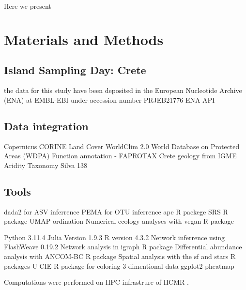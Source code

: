 \documentclass[unnumsec,webpdf,contemporary,large]{oup-authoring-template}%
\theoremstyle{thmstyleone}%
\theoremstyle{thmstyletwo}%
\theoremstyle{thmstylethree}%
\begin{document}
Here we present



\section{Materials and Methods}\label{methods}


\subsection{Island Sampling Day: Crete}\label{isd_data}

the data for this study have been deposited in the European Nucleotide Archive (ENA) at EMBL-EBI under accession number PRJEB21776
ENA API \citep{Yuan2023}

\subsection{Data integration}\label{data}

Copernicus CORINE Land Cover \citep{CLC2023}
WorldClim 2.0 \citep{Fick2017}
World Database on Protected Areas (WDPA) \citep{Hanson2022}
Function annotation - FAPROTAX \citep{Louca2016}
Crete geology from IGME
Aridity
Taxonomy Silva 138 \citep{Quast2012}

\subsection{Tools}\label{tools}
dada2 for ASV inferrence \citep{Callahan2016}
PEMA for OTU inferrence \citep{Zafeiropoulos2020}
ape R packege \citep{Paradis2004}
SRS R package \citep{Beule2020}
UMAP ordination \citep{mcinnes2018umap-software}
Numerical ecology analyses with vegan R package \citep{vegan}

Python 3.11.4
Julia Version 1.9.3 \citep{Julia-2017}
R version 4.3.2 \citep{rcoreteam}
Network inferrence using FlashWeave 0.19.2 \citep{Tackmann2019}
Network analysis in igraph R package \citep{Csardi2006}
Differential abundance analysis with ANCOM-BC R package \citep{Lin2020}
Spatial analysis with the sf and stars R packages \citep{Pebesma2023}
U-CIE R package for coloring 3 dimentional data \citep{Koutrouli2022}
ggplot2 \citep{ggplot22016}
pheatmap \citep{Kolde2019}

Computations were performed on HPC infrastrure of HCMR \citep{Zafeiropoulos2021}.
\end{document}

